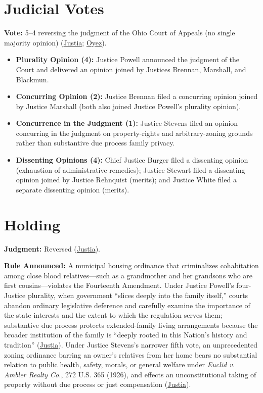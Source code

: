\documentclass[12pt]{article}
\begin{document}
\section{Judicial Votes}
\textbf{Vote:} 5--4 reversing the judgment of the Ohio Court of Appeals (no single majority opinion) (\href{https://supreme.justia.com/cases/federal/us/431/494/}{Justia}; \href{https://www.oyez.org/cases/1976/75-6289}{Oyez}).
\begin{itemize}
\item \textbf{Plurality Opinion (4):} Justice Powell announced the judgment of the Court and delivered an opinion joined by Justices Brennan, Marshall, and Blackmun.
\item \textbf{Concurring Opinion (2):} Justice Brennan filed a concurring opinion joined by Justice Marshall (both also joined Justice Powell's plurality opinion).
\item \textbf{Concurrence in the Judgment (1):} Justice Stevens filed an opinion concurring in the judgment on property-rights and arbitrary-zoning grounds rather than substantive due process family privacy.
\item \textbf{Dissenting Opinions (4):} Chief Justice Burger filed a dissenting opinion (exhaustion of administrative remedies); Justice Stewart filed a dissenting opinion joined by Justice Rehnquist (merits); and Justice White filed a separate dissenting opinion (merits).
\end{itemize}

\section{Holding}
\textbf{Judgment:} Reversed (\href{https://supreme.justia.com/cases/federal/us/431/494/}{Justia}).

\textbf{Rule Announced:} A municipal housing ordinance that criminalizes cohabitation among close blood relatives---such as a grandmother and her grandsons who are first cousins---violates the Fourteenth Amendment. Under Justice Powell's four-Justice plurality, when government ``slices deeply into the family itself,'' courts abandon ordinary legislative deference and carefully examine the importance of the state interests and the extent to which the regulation serves them; substantive due process protects extended-family living arrangements because the broader institution of the family is ``deeply rooted in this Nation's history and tradition'' (\href{https://supreme.justia.com/cases/federal/us/431/494/}{Justia}). Under Justice Stevens's narrower fifth vote, an unprecedented zoning ordinance barring an owner's relatives from her home bears no substantial relation to public health, safety, morals, or general welfare under \textit{Euclid v. Ambler Realty Co.}, 272 U.S. 365 (1926), and effects an unconstitutional taking of property without due process or just compensation (\href{https://supreme.justia.com/cases/federal/us/431/494/}{Justia}).
\end{document}
